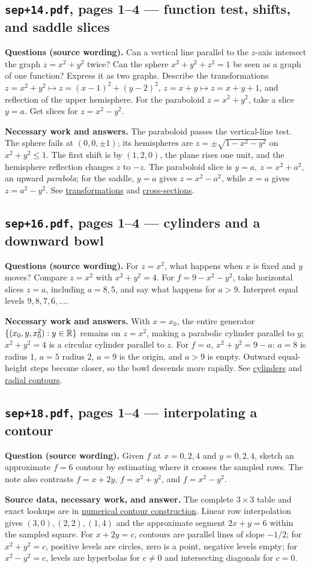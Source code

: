 \subsection{\texttt{sep+14.pdf}, pages 1--4 --- function test, shifts, and saddle slices}
\textbf{Questions (source wording).} Can a vertical line parallel to the $z$-axis intersect the graph $z=x^2+y^2$ twice? Can the sphere $x^2+y^2+z^2=1$ be seen as a graph of one function? Express it as two graphs. Describe the transformations $z=x^2+y^2\mapsto z=(x-1)^2+(y-2)^2$, $z=x+y\mapsto z=x+y+1$, and reflection of the upper hemisphere. For the paraboloid $z=x^2+y^2$, take a slice $y=a$. Get slices for $z=x^2-y^2$.\par
\textbf{Necessary work and answers.} The paraboloid passes the vertical-line test. The sphere fails at $(0,0,\pm1)$; its hemispheres are $z=\pm\sqrt{1-x^2-y^2}$ on $x^2+y^2\leq1$. The first shift is by $(1,2,0)$, the plane rises one unit, and the hemisphere reflection changes $z$ to $-z$. The paraboloid slice is $y=a,\ z=x^2+a^2$, an upward \emph{parabola}; for the saddle, $y=a$ gives $z=x^2-a^2$, while $x=a$ gives $z=a^2-y^2$. See \hyperref[transform]{transformations} and \hyperref[cross]{cross-sections}.

\subsection{\texttt{sep+16.pdf}, pages 1--4 --- cylinders and a downward bowl}
\textbf{Questions (source wording).} For $z=x^2$, what happens when $x$ is fixed and $y$ moves? Compare $z=x^2$ with $x^2+y^2=4$. For $f=9-x^2-y^2$, take horizontal slices $z=a$, including $a=8,5$, and say what happens for $a>9$. Interpret equal levels $9,8,7,6,\ldots$.\par
\textbf{Necessary work and answers.} With $x=x_0$, the entire generator $\{(x_0,y,x_0^2):y\in\mathbb R\}$ remains on $z=x^2$, making a parabolic cylinder parallel to $y$; $x^2+y^2=4$ is a circular cylinder parallel to $z$. For $f=a$, $x^2+y^2=9-a$: $a=8$ is radius $1$, $a=5$ radius $2$, $a=9$ is the origin, and $a>9$ is empty. Outward equal-height steps become closer, so the bowl descends more rapidly. See \hyperref[cylinder]{cylinders} and \hyperref[radial]{radial contours}.

\subsection{\texttt{sep+18.pdf}, pages 1--4 --- interpolating a contour}
\textbf{Question (source wording).} Given $f$ at $x=0,2,4$ and $y=0,2,4$, sketch an approximate $f=6$ contour by estimating where it crosses the sampled rows. The note also contrasts $f=x+2y$, $f=x^2+y^2$, and $f=x^2-y^2$.\par
\textbf{Source data, necessary work, and answer.} The complete $3\times3$ table and exact lookups are in \hyperref[table]{numerical contour construction}. Linear row interpolation gives $(3,0),(2,2),(1,4)$ and the approximate segment $2x+y=6$ within the sampled square. For $x+2y=c$, contours are parallel lines of slope $-1/2$; for $x^2+y^2=c$, positive levels are circles, zero is a point, negative levels empty; for $x^2-y^2=c$, levels are hyperbolas for $c\ne0$ and intersecting diagonals for $c=0$.

